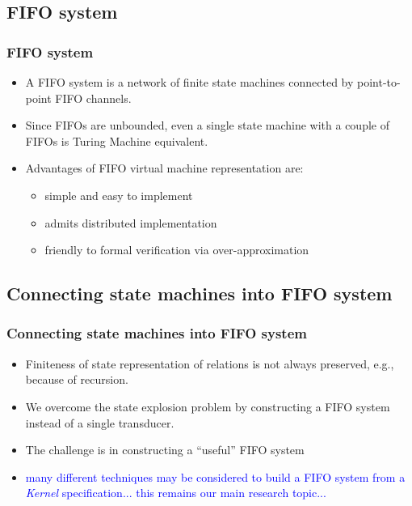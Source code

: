 \documentclass[utf8]{beamer}
\newcommand{\Kernel}{\textit{Kernel}}
\newcommand{\mypause}{\pause}
\begin{document}
\subsection{FIFO system}
\begin{frame}
  \frametitle{FIFO system}
  \begin{itemize}
  \item A FIFO system is a network of finite state machines connected
    by point-to-point FIFO channels. \mypause
  \item Since FIFOs are unbounded, even a single state machine with a
    couple of FIFOs is Turing Machine equivalent. \mypause
  \item Advantages of FIFO virtual machine representation are:
    \begin{itemize}
    \item simple and easy to implement \mypause 
    \item admits distributed implementation \mypause
    \item friendly to formal verification via over-approximation
    \end{itemize}

  \end{itemize}
\end{frame}

\subsection{Connecting state machines into FIFO system}
\begin{frame}
  \frametitle{Connecting state machines into FIFO system}
  \begin{itemize}
  \item Finiteness of state representation of relations is not always
     preserved, e.g., because of recursion. \mypause
   \item We overcome the state explosion problem by constructing a
     FIFO system instead of a single transducer. \mypause
   \item The challenge is in constructing a ``useful'' FIFO system  
     \mypause
     \vfill
   \item[] \textcolor{blue}{many different techniques may be
       considered to build a FIFO system from a \Kernel{}
       specification... this remains our main research topic... }
  \end{itemize}

\end{frame}
\end{document}
